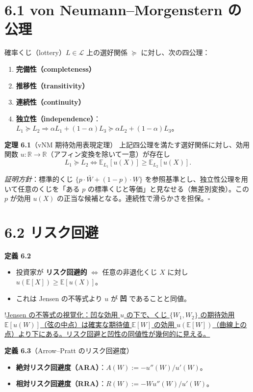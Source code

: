 \documentclass[11pt,a4paper]{report}
\begin{document}
\section{6.1 von Neumann–Morgenstern の公理}

確率くじ（lottery）$L \in \mathcal{L}$ 上の選好関係 $\succeq$ に対し、次の四公理：

\begin{enumerate}
\item \textbf{完備性（completeness）}
\item \textbf{推移性（transitivity）}
\item \textbf{連続性（continuity）}
\item \textbf{独立性（independence）}：$L_1 \succeq L_2 \Rightarrow \alpha L_1 + (1-\alpha) L_3 \succeq \alpha L_2 + (1-\alpha) L_3$。
\end{enumerate}

\textbf{定理 6.1}（vNM 期待効用表現定理） 上記四公理を満たす選好関係に対し、効用関数 $u: \mathbb{R} \to \mathbb{R}$（アフィン変換を除いて一意）が存在し \[ L_1 \succeq L_2 \iff \mathbb{E}_{L_1}[u(X)] \ge \mathbb{E}_{L_2}[u(X)]. \]

\emph{証明方針}：標準的くじ $\{p \cdot \bar W + (1-p) \cdot \underline W\}$ を参照基準とし、独立性公理を用いて任意のくじを「ある $p$ の標準くじと等価」と見なせる（無差別変換）。この $p$ が効用 $u(X)$ の正当な候補となる。連続性で滑らかさを担保。$\square$

\section{6.2 リスク回避}

\textbf{定義 6.2}
\begin{itemize}
\item 投資家が \textbf{リスク回避的} $\iff$ 任意の非退化くじ $X$ に対し $u(\mathbb{E}[X]) \ge \mathbb{E}[u(X)]$。
\item これは Jensen の不等式より $u$ が \textbf{凹} であることと同値。
\end{itemize}

!\href{figures/jensen\_inequality.png}{Jensen の不等式の視覚化：凹な効用 $u$ の下で、くじ $\{W_1, W_2\}$ の期待効用 $\mathbb{E}[u(W)]$（弦の中点）は確実な期待値 $\mathbb{E}[W]$ の効用 $u(\mathbb{E}[W])$（曲線上の点）より下にある。リスク回避と凹性の同値性が幾何的に見える。}

\textbf{定義 6.3}（Arrow–Pratt のリスク回避度）
\begin{itemize}
\item \textbf{絶対リスク回避度（ARA）}：$A(W) := -u''(W) / u'(W)$。
\item \textbf{相対リスク回避度（RRA）}：$R(W) := -W u''(W) / u'(W)$。
\end{itemize}
\end{document}
